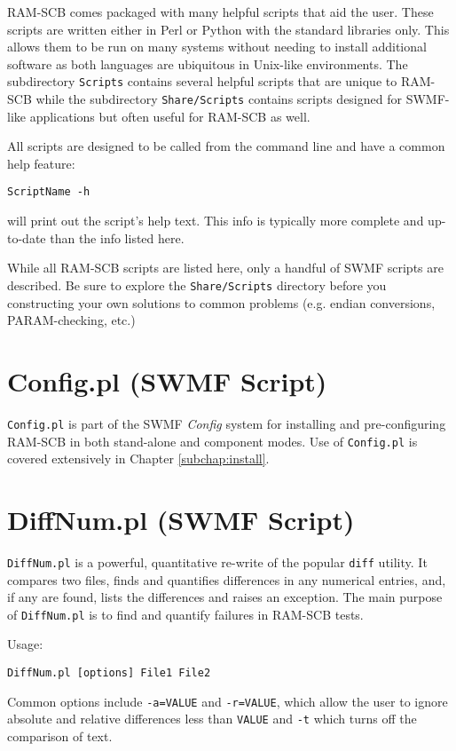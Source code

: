 RAM-SCB comes packaged with many helpful scripts that aid the user.  These 
scripts are written either in Perl or Python with the standard libraries only.
This allows them to be run on many systems without needing to install 
additional software as both languages are ubiquitous in Unix-like 
environments.  The subdirectory {\tt Scripts} contains several helpful 
scripts that are unique to RAM-SCB while the subdirectory {\tt Share/Scripts}
contains scripts designed for SWMF-like applications but often useful for 
RAM-SCB as well.

All scripts are designed to be called from the command line and have a common
help feature:
\begin{verbatim}
ScriptName -h
\end{verbatim}
\noindent will print out the script's help text.  This info is typically 
more complete and up-to-date than the info listed here.

While all RAM-SCB scripts are listed here, only a handful of SWMF scripts are
described.  Be sure to explore the {\tt Share/Scripts} directory before you
constructing your own solutions to common problems (e.g. endian conversions, 
PARAM-checking, etc.) 

\section{Config.pl (SWMF Script)}
{\tt Config.pl} is part of the SWMF \textit{Config} system for installing and
pre-configuring RAM-SCB in both stand-alone and component modes.  
Use of {\tt Config.pl} is covered extensively in Chapter \ref{subchap:install}.

\section{DiffNum.pl (SWMF Script)}
{\tt DiffNum.pl} is a powerful, quantitative re-write of the popular {\tt diff}
utility.  It compares two files, finds and quantifies differences in any
numerical entries, and, if any are found, lists the differences and raises an
exception.  The main purpose of {\tt DiffNum.pl} is to find and quantify 
failures in RAM-SCB tests.

Usage:
\begin{verbatim}
DiffNum.pl [options] File1 File2
\end{verbatim}

Common options include {\tt -a=VALUE} and {\tt -r=VALUE}, which allow the user
to ignore absolute and relative differences less than {\tt VALUE} and {\tt -t}
which turns off the comparison of text.


